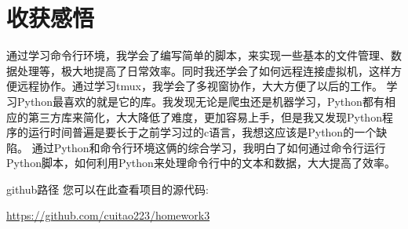 \documentclass{article}
\begin{document}
\section{收获感悟}
通过学习命令行环境，我学会了编写简单的脚本，来实现一些基本的文件管理、数据处理等，极大地提高了日常效率。同时我还学会了如何远程连接虚拟机，这样方便远程协作。通过学习tmux，我学会了多视窗协作，大大方便了以后的工作。
学习Python最喜欢的就是它的库。我发现无论是爬虫还是机器学习，Python都有相应的第三方库来简化，大大降低了难度，更加容易上手，但是我又发现Python程序的运行时间普遍是要长于之前学习过的c语言，我想这应该是Python的一个缺陷。
通过Python和命令行环境这俩的综合学习，我明白了如何通过命令行运行Python脚本，如何利用Python来处理命令行中的文本和数据，大大提高了效率。

github路径
您可以在此查看项目的源代码: 

\url{https://github.com/cuitao223/homework3}
\end{document}
